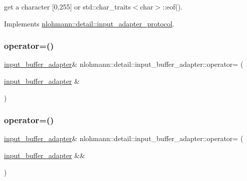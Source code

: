 get a character \mbox{[}0,255\mbox{]} or std\+::char\+\_\+traits$<$char$>$\+::eof(). 



Implements \hyperlink{structnlohmann_1_1detail_1_1input__adapter__protocol_aac10a6a4048a8ce8e2ed50277692a3ca}{nlohmann\+::detail\+::input\+\_\+adapter\+\_\+protocol}.

\mbox{\label{classnlohmann_1_1detail_1_1input__buffer__adapter_a0871125057d993684ba8e45fb2b8a76b}} 
\subsubsection{\texorpdfstring{operator=()}{operator=()}\hspace{0.1cm}{\footnotesize\ttfamily [1/2]}}
{\footnotesize\ttfamily \hyperlink{classnlohmann_1_1detail_1_1input__buffer__adapter}{input\+\_\+buffer\+\_\+adapter}\& nlohmann\+::detail\+::input\+\_\+buffer\+\_\+adapter\+::operator= (\begin{DoxyParamCaption}\item[{\hyperlink{classnlohmann_1_1detail_1_1input__buffer__adapter}{input\+\_\+buffer\+\_\+adapter} \&}]{ }\end{DoxyParamCaption})\hspace{0.3cm}{\ttfamily [delete]}}

\mbox{\label{classnlohmann_1_1detail_1_1input__buffer__adapter_a19bb3ff68048a2fc8ecc41a013af37ae}} 
\subsubsection{\texorpdfstring{operator=()}{operator=()}\hspace{0.1cm}{\footnotesize\ttfamily [2/2]}}
{\footnotesize\ttfamily \hyperlink{classnlohmann_1_1detail_1_1input__buffer__adapter}{input\+\_\+buffer\+\_\+adapter}\& nlohmann\+::detail\+::input\+\_\+buffer\+\_\+adapter\+::operator= (\begin{DoxyParamCaption}\item[{\hyperlink{classnlohmann_1_1detail_1_1input__buffer__adapter}{input\+\_\+buffer\+\_\+adapter} \&\&}]{ }\end{DoxyParamCaption})\hspace{0.3cm}{\ttfamily [delete]}}



